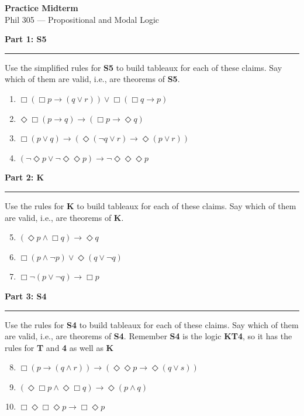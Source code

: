 \documentclass[10pt]{article}
\newcommand{\ruleheader}[1]{\medskip\noindent\textbf{\large #1}\par\smallskip\hrule\smallskip}
\begin{document}
\begin{center}
{\LARGE\bfseries Practice Midterm}\\[4pt]
{\large Phil 305 --- Propositional and Modal Logic}
\end{center}

\ruleheader{Part 1: S5}

Use the simplified rules for \textbf{S5} to build tableaux for each of these claims. Say which of them are valid, i.e., are theorems of \textbf{S5}.

\begin{enumerate}
\item $\Box(\Box p \rightarrow (q \vee r)) \vee \Box(\Box q \rightarrow p)$
\item $\Diamond \Box (p \rightarrow q) \rightarrow (\Box p \rightarrow \Diamond q)$
\item $\Box (p \vee q) \rightarrow (\Diamond (\neg q \vee r) \rightarrow \Diamond (p \vee r))$
\item $(\neg \Diamond p \vee \neg \Diamond \Diamond p) \rightarrow \neg \Diamond \Diamond \Diamond p$
\end{enumerate}

\ruleheader{Part 2: K}

Use the rules for \textbf{K} to build tableaux for each of these claims. Say which of them are valid, i.e., are theorems of \textbf{K}.

\begin{enumerate}
\setcounter{enumi}{4}
\item $(\Diamond p \wedge \Box q) \rightarrow \Diamond q$
\item $\Box (p \wedge \neg p) \vee \Diamond (q \vee \neg q)$
\item $\Box \neg(p \vee \neg q) \rightarrow \Box p$
\end{enumerate}

\ruleheader{Part 3: S4}

Use the rules for \textbf{S4} to build tableaux for each of these claims. Say which of them are valid, i.e., are theorems of \textbf{S4}. Remember \textbf{S4} is the logic \textbf{KT4}, so it has the rules for \textbf{T} and \textbf{4} as well as \textbf{K}

\begin{enumerate}
\setcounter{enumi}{7}
\item $\Box(p \rightarrow (q \wedge r)) \rightarrow (\Diamond \Diamond p \rightarrow \Diamond (q \vee s))$
\item $(\Diamond \Box p \wedge \Diamond \Box q) \rightarrow \Diamond(p \wedge q)$
\item $ \Box \Diamond \Box \Diamond p \rightarrow \Box \Diamond p$
\end{enumerate}
\end{document}

